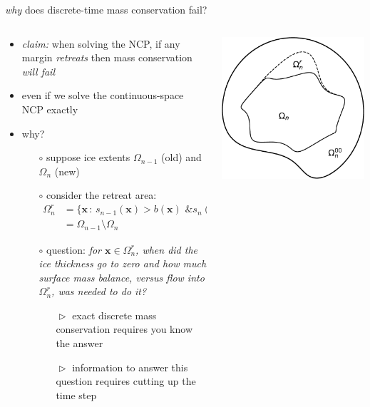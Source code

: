 \documentclass[10pt,hyperref,dvipsnames]{beamer}
\newcommand{\bx}{\mathbf{x}}
\begin{document}
\begin{frame}{\emph{why} does discrete-time mass conservation fail?}

\begin{columns}
\begin{column}{0.7\textwidth}
\begin{itemize}
\item \emph{claim:} when solving the NCP, if any margin \emph{retreats} then mass conservation \emph{will fail}
\item even if we solve the continuous-space NCP exactly
\item why?
    \begin{itemize}
    \item[$\circ$] suppose ice extents $\Omega_{n-1}$ (old) and $\Omega_n$ (new)
    \item[$\circ$] consider the retreat area:
        \begin{align*}
        \Omega_n^r &= \{\bx\,:\, s_{n-1}(\bx)>b(\bx) \text{ \& } s_{n}(\bx)=b(\bx)\} \\
                   &= \Omega_{n-1} \setminus \Omega_n
        \end{align*}
    \item[$\circ$] question: \emph{for $\bx \in \Omega_n^r$, when did the ice thickness go to zero and how much surface mass balance, versus flow into $\Omega_n^r$, was needed to do it?}
        \begin{itemize}
        \item[$\vartriangleright$] exact discrete mass conservation requires you know the answer
        \item[$\vartriangleright$] information to answer this question requires cutting up the time step
        \end{itemize}
    \end{itemize}
\end{itemize}
\end{column}
\begin{column}{0.3\textwidth}
\includegraphics[width=\textwidth]{figs/domains-fig.pdf}

\end{column}
\end{columns}
\end{frame}
\end{document}
